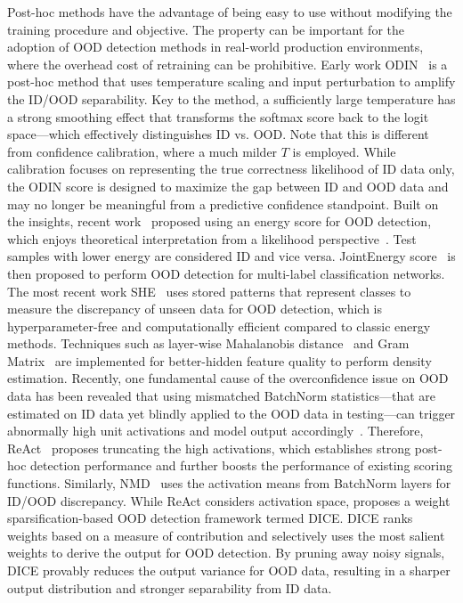 \label{sec:ood_confcal}
Post-hoc methods have the advantage of being easy to use without modifying the training procedure and objective. The property can be important for the adoption of OOD detection methods in real-world production environments, where the overhead cost of retraining can be prohibitive. Early work ODIN~ is a post-hoc method that uses temperature scaling and input perturbation to amplify the ID/OOD separability. Key to the method, a sufficiently large temperature has a strong smoothing effect that transforms the softmax score back to the logit space---which effectively distinguishes ID vs. OOD. Note that this is different from confidence calibration, where a much milder $T$ is employed. While calibration focuses on representing the true correctness likelihood of {ID data only}, the ODIN score is designed to maximize the gap between ID and OOD data and may no longer be meaningful from a predictive confidence standpoint. 
Built on the insights, recent work~ proposed using an energy score for OOD detection, which enjoys theoretical interpretation from a likelihood perspective~. Test samples with lower energy are considered ID and vice versa. 
JointEnergy score~ is then proposed to perform OOD detection for multi-label classification networks. The most recent work SHE~ uses stored patterns that represent classes to measure the discrepancy of unseen data for OOD detection, which is hyperparameter-free and computationally efficient compared to classic energy methods.
Techniques such as layer-wise Mahalanobis distance~ and Gram Matrix~ are implemented for better-hidden feature quality to perform density estimation.
Recently, one fundamental cause of the overconfidence issue on OOD data has been revealed that using mismatched BatchNorm statistics---that are estimated on ID data yet blindly applied to the OOD data in testing---can trigger abnormally high unit activations and model output accordingly~. Therefore, ReAct~ proposes truncating the high activations, which establishes strong post-hoc detection performance and further boosts the performance of existing scoring functions. 
Similarly, NMD~ uses the activation means from BatchNorm layers for ID/OOD discrepancy.
While {ReAct} considers activation space,  proposes a weight sparsification-based OOD detection framework termed DICE. DICE ranks weights based on a measure of contribution and selectively uses the most salient weights to derive the output for OOD detection. By pruning away noisy signals, DICE provably reduces the output variance for OOD data, resulting in a sharper output distribution and stronger separability from ID data. 
